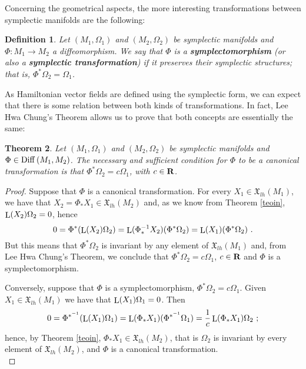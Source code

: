 \documentclass[12pt]{report}
\newtheorem{teor}{Theorem}[chapter]
\newtheorem{definition}[teor]{Definition}
\def\qed{\ifvmode\removelastskip\fi
{\unskip\nobreak\hfil\penalty50\hbox{}\nobreak\hfil
\hbox{\vrule height1.2ex width1.2ex}\parfillskip=0pt
\finalhyphendemerits=0 \par\smallskip}}
\def\vf{\mathfrak X}
\def\Lie{\mathop{\rm L}\nolimits}
\begin{document}

Concerning the geometrical aspects,
the more interesting transformations between symplectic manifolds
are the following:

\begin{definition}
Let $(M_1,\Omega_1)$ and $(M_2,\Omega_2)$ be
symplectic manifolds and $\Phi:M_{1}\to M_{2}$ a diffeomorphism.
We say that $\Phi$ is a \textbf{symplectomorphism}
(or also a \textbf{symplectic  transformation\/})
if it  preserves their symplectic structures;
that is, $\Phi^*\Omega_2 = \Omega_1$.
\end{definition}

As Hamiltonian vector fields are defined using the symplectic form,
we can expect that there is some relation between both kinds of transformations.
In fact, Lee Hwa Chung's Theorem allows us to prove that
both concepts are essentially the same:

\begin{teor}
Let $(M_1,\Omega_1)$ and $(M_2,\Omega_2)$ be
symplectic manifolds 
and $\Phi \in {\rm Diff}\,(M_1,M_2)$.
The necessary and sufficient condition for $\Phi$
to be a canonical transformation is that
$\Phi^*\Omega_2 = c\Omega_1$, with $c \in {\bf R}$.
\label{teosim}
\end{teor}
\begin{proof}  Suppose that $\Phi$ is a canonical transformation. For every
$X_1 \in \vf_{lh} (M_1)$, we have that
$X_{2}=\Phi_*X_1\in \vf_{lh}(M_2)$ and,
as we know from Theorem \ref{teoin},
$\Lie (X_2)\Omega_2 = 0$, hence
$$
0 = \Phi^*(\Lie (X_2)\Omega_2) =
\Lie (\Phi_*^{-1}X_2)(\Phi^*\Omega_2) =
\Lie (X_1)(\Phi^*\Omega_2) \ .
$$
But this means that $\Phi^*\Omega_2$ is invariant by any element of $\vf_{lh} (M_1)$ and, from Lee Hwa Chung's Theorem,
we conclude that
$\Phi^*\Omega_2 = c\Omega_1$, $c \in {\bf R}$ and $\Phi$ is a symplectomorphism.

Conversely, suppose that $\Phi$ is a symplectomorphism, $\Phi^*\Omega_2 = c\Omega_1$. Given $X_1 \in \vf_{lh}(M_1)$ we have that $\Lie (X_1)\Omega_1 = 0$. Then
$$
0 = \Phi^{*^{-1}}(\Lie (X_1)\Omega_1) =
\Lie (\Phi_*X_1)(\Phi^{*^{-1}}\Omega_1) =
\frac{1}{c}\Lie (\Phi_*X_1)\Omega_2 \ ;
$$
hence, by Theorem \ref{teoin}, $\Phi_*X_1 \in \vf_{lh}(M_2)$, that is $\Omega_{2}$ is invariant by every element of  $\vf_{lh}(M_2)$,
and $\Phi$ is a canonical transformation.
\\ \qed  \end{proof}
\end{document}
